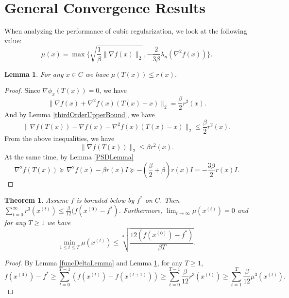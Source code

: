 \documentclass[openany]{book}
\newtheorem{lemma}{Lemma}[chapter]
\newtheorem{theorem}{Theorem}[chapter]
\theoremstyle{definition}
\theoremstyle{remark}
\begin{document}
\section{General Convergence Results}
When analyzing the performance of cubic regularization, we look at the following value:
\begin{equation}
    \mu(x)=\max\{\sqrt{\frac{1}{\beta}\|\nabla f(x)\|_2},-\frac{2}{3\beta}\lambda_n(\nabla^2f(x))\}.
\end{equation}
\begin{lemma}\label{errorBoundLemma}
    For any $x\in C$ we have $\mu(T(x))\le r(x)$.
\end{lemma}
\begin{proof}
    Since $\nabla \phi_x(T(x))=0$, we have
    \begin{equation*}
        \|\nabla f(x)+\nabla^2f(x)(T(x)-x)\|_2=\frac{\beta}{2}r^2(x).
    \end{equation*}
    And by Lemma \ref{thirdOrderUpperBound}, we have
    \begin{equation*}
        \|\nabla f(T(x))-\nabla f(x)-\nabla^2f(x)(T(x)-x)\|_2\le \frac{\beta}{2}r^2(x).
    \end{equation*}
    From the above inequalities, we have
    \begin{equation*}
        \|\nabla f(T(x))\|_2\le\beta r^2(x).
    \end{equation*}
    At the same time, by Lemma \ref{PSDLemma}
    \begin{equation*}
        \nabla^2f(T(x))\succeq\nabla^2f(x)-\beta r(x)I\succeq-(\frac{\beta}{2}+\beta)r(x)I=-\frac{3\beta}{2}r(x)I.
    \end{equation*}
\end{proof}
\begin{theorem}
    Assume $f$ is bonuded below by $f^*$ on $C$. Then $\sum_{t=0}^{\infty}r^3(x^{(t)})\le \frac{\beta}{12}(f(x^{(0)}-f^*)$. Furthermore, $\lim_{t\to\infty}\mu(x^{(t)})=0$ and for any $T\ge1$ we have
    \begin{equation}
        \min_{1\le t\le T}\mu(x^{(t)})\le\sqrt[3]{\frac{12(f(x^{(0)})-f^*)}{\beta T}}.
    \end{equation}
\end{theorem}
\begin{proof}
    By Lemma \ref{funcDeltaLemma} and Lemma \ref{errorBoundLemma}, for any $T\ge 1$,
    \begin{equation*}
        f(x^{(0)})-f^*\ge \sum_{t=0}^{T-1}(f(x^{(t)})-f(x^{(t+1)}))\ge \sum_{t=0}^{T-1}\frac{\beta}{12}r^3(x^{(t)})\ge \sum_{t=1}^{T}\frac{\beta}{12}\mu^3(x^{(t)}).
    \end{equation*}
\end{proof}
\end{document}
